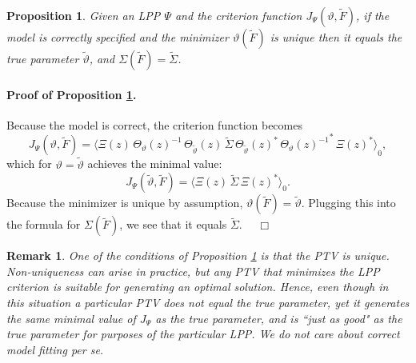 \documentclass[a4paper]{book}
\newtheorem{Proposition}{Proposition}
\newtheorem{Remark}{Remark}
\begin{document}
\begin{Proposition}
 \label{prop:PTV-truth}
 Given an LPP $\Psi$ and the criterion function $J_{\Psi} (\vartheta, \widetilde{F})$,
 if the model is correctly specified and the 
 minimizer $\vartheta (\widetilde{F})$ is unique then it equals the true parameter 
$\widetilde{\vartheta}$, and $\Sigma (\widetilde{F}) = \widetilde{\Sigma}$.
\end{Proposition}

\paragraph{Proof of Proposition \ref{prop:PTV-truth}.}
 Because the model is correct, the criterion function becomes
\[
  J_{\Psi} (\vartheta, \widetilde{F}) = { \langle \Xi (z) \, { \Theta_{\vartheta   } (z) }^{-1} \, 
   \Theta_{\widetilde{\vartheta}} (z) \, \widetilde{\Sigma} \, 
  {\Theta_{\widetilde{\vartheta}} (z)  }^* \, { { \Theta_{\vartheta  } (z) }^{-1} }^*
 \, { \Xi (z) }^* \rangle }_0,
\]
 which for $\vartheta = \widetilde{\vartheta}$ achieves the minimal value:
\[
  J_{\Psi} (\widetilde{\vartheta}, \widetilde{F})  ={ \langle \Xi (z) \,   \widetilde{\Sigma} \, 
   { \Xi (z) }^* \rangle }_0.
\]
  Because the minimizer is unique by assumption, $\vartheta (\widetilde{F}) = \widetilde{\vartheta} $. 
  Plugging this into the formula
 for $\Sigma (\widetilde{F})$, we see that it equals $\widetilde{\Sigma}$.  $\quad \Box$

\vspace{.5cm}


\begin{Remark} \rm  
\label{rem:PTVunique}
 One of the conditions of Proposition \ref{prop:PTV-truth} is that the PTV is unique.  
 Non-uniqueness can arise in practice, but any PTV that minimizes the LPP criterion 
 is suitable for generating an optimal solution.  Hence, even though in this situation
 a particular PTV does not equal the true parameter, yet it generates the same minimal
 value of $J_{\Psi}$ as the true parameter, and is ``just as good" as the true parameter
 for purposes of the particular LPP.  We do not care about correct model fitting {\it per se}.
\end{Remark}
\end{document}
